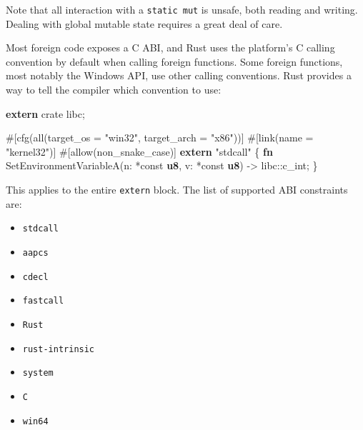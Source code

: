\documentclass[a4paper,]{book}
\newenvironment{Shaded}{\begin{snugshade}}{\end{snugshade}}
\newcommand{\KeywordTok}[1]{\textcolor[rgb]{0.13,0.29,0.53}{\textbf{{#1}}}}
\newcommand{\StringTok}[1]{\textcolor[rgb]{0.31,0.60,0.02}{{#1}}}
\newcommand{\OtherTok}[1]{\textcolor[rgb]{0.56,0.35,0.01}{{#1}}}
\newcommand{\NormalTok}[1]{{#1}}
\begin{document}
Note that all interaction with a \texttt{static\ mut} is unsafe, both
reading and writing. Dealing with global mutable state requires a great
deal of care.


Most foreign code exposes a C ABI, and Rust uses the platform's C
calling convention by default when calling foreign functions. Some
foreign functions, most notably the Windows API, use other calling
conventions. Rust provides a way to tell the compiler which convention
to use:

\begin{Shaded}
\begin{Highlighting}[]
\KeywordTok{extern} \NormalTok{crate libc;}

\OtherTok{#[}\NormalTok{cfg}\OtherTok{(}\NormalTok{all}\OtherTok{(}\NormalTok{target_os }\OtherTok{=} \StringTok{"win32"}\OtherTok{,} \NormalTok{target_arch }\OtherTok{=} \StringTok{"x86"}\OtherTok{))]}
\OtherTok{#[}\NormalTok{link}\OtherTok{(}\NormalTok{name }\OtherTok{=} \StringTok{"kernel32"}\OtherTok{)]}
\OtherTok{#[}\NormalTok{allow}\OtherTok{(}\NormalTok{non_snake_case}\OtherTok{)]}
\KeywordTok{extern} \StringTok{"stdcall"} \NormalTok{\{}
    \KeywordTok{fn} \NormalTok{SetEnvironmentVariableA(n: *const }\KeywordTok{u8}\NormalTok{, v: *const }\KeywordTok{u8}\NormalTok{) -> libc::c_int;}
\NormalTok{\}}
\end{Highlighting}
\end{Shaded}

This applies to the entire \texttt{extern} block. The list of supported
ABI constraints are:

\begin{itemize}
\itemsep1pt\parskip0pt
\item
  \texttt{stdcall}
\item
  \texttt{aapcs}
\item
  \texttt{cdecl}
\item
  \texttt{fastcall}
\item
  \texttt{Rust}
\item
  \texttt{rust-intrinsic}
\item
  \texttt{system}
\item
  \texttt{C}
\item
  \texttt{win64}
\end{itemize}
\end{document}
